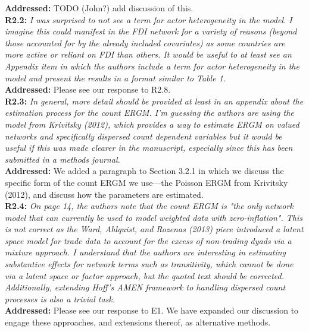 \documentclass[a4paper,11pt]{texMemo}
\begin{document}
\noindent \textbf{Addressed:} TODO (John?) add discussion of this.\\

\noindent \textbf{R2.2:} \emph{I was surprised to not see a term for actor heterogeneity in the model. I imagine this could manifest in the FDI network for a variety of reasons (beyond those accounted for by the already included covariates) as some countries are more active or reliant on FDI than others. It would be useful to at least see an Appendix item in which the authors include a term for actor heterogeneity in the model and present the results in a format similar to Table 1.}\\

\noindent \textbf{Addressed:} Please see our response to R2.8. \\

\noindent \textbf{R2.3:} \emph{In general, more detail should be provided at least in an appendix about the estimation process for the count ERGM. I'm guessing the authors are using the model from Krivitsky (2012), which provides a way to estimate ERGM on valued networks and specifically dispersed count dependent variables but it would be useful if this was made clearer in the manuscript, especially since this has been submitted in a methods journal.}\\

\noindent \textbf{Addressed:} We added a paragraph to Section 3.2.1 in which we discuss the specific form of the count ERGM we use---the Poisson ERGM from Krivitsky (2012), and discuss how the parameters are estimated. \\

\noindent \textbf{R2.4:} \emph{On page 14, the authors note that the count ERGM is "the only network model that can currently be used to model weighted data with zero-inflation". This is not correct as the Ward, Ahlquist, and Rozenas (2013) piece introduced a latent space model for trade data to account for the excess of non-trading dyads via a mixture approach. I understand that the authors are interesting in estimating substantive effects for network terms such as transitivity, which cannot be done via a latent space or factor approach, but the quoted text should be corrected. Additionally, extending Hoff's AMEN framework to handling dispersed count processes is also a trivial task.}\\

\noindent \textbf{Addressed:} Please see our response to E1. We have expanded our discussion to engage these approaches, and extensions thereof, as alternative methods.\\
\end{document}
